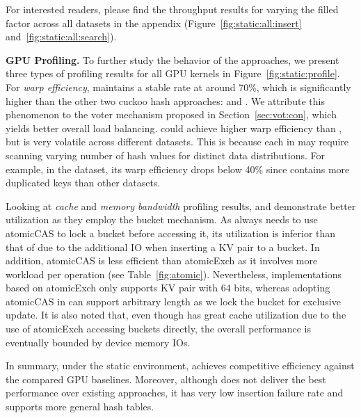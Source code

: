 For interested readers, please find the throughput results for varying the filled factor across all datasets in the appendix (Figure~\ref{fig:static:all:insert} and~\ref{fig:static:all:search}). 





\vspace{1mm}\noindent\textbf{GPU Profiling.} To further study the behavior of the approaches, we present three types of profiling results for all  GPU kernels in Figure~\ref{fig:static:profile}.
For \emph{warp efficiency}, \voter maintains a stable rate at around 70\%, which is significantly higher than the other two cuckoo hash approaches: \megakv and \cudpp.  
We attribute this phenomenon to the voter mechanism proposed in Section~\ref{sec:vot:con}, which yields better overall load balancing. 
\linear could achieve higher warp efficiency than \voter, but is very volatile across different datasets. This is because each  in \linear may require scanning varying number of hash values for distinct data distributions. 
For example, in the \dsali dataset, its warp efficiency drops below 40\% since \dsali contains more duplicated keys than other datasets. 

Looking at \emph{cache} and \emph{memory bandwidth} profiling results, \megakv and \voter demonstrate better utilization as they employ the bucket mechanism.
As \voter always needs to use atomicCAS to lock a bucket before accessing it, its utilization is inferior than that of \megakv due to the additional IO when inserting a KV pair to a bucket. In addition, atomicCAS is less efficient than atomicExch as it involves more workload per operation (see Table~\ref{fig:atomic}). Nevertheless, implementations based on atomicExch only supports KV pair with 64 bits, whereas adopting atomicCAS in \voter can support arbitrary length as we lock the bucket for exclusive update.
It is also noted that, even though \megakv has great cache utilization due to the use of atomicExch accessing buckets directly, the overall performance is eventually bounded by device memory IOs. 

In summary, under the static environment, \voter achieves competitive efficiency against the compared GPU baselines. Moreover, although \voter does not deliver the best performance over existing approaches, it has very low insertion failure rate and supports more general hash tables.



